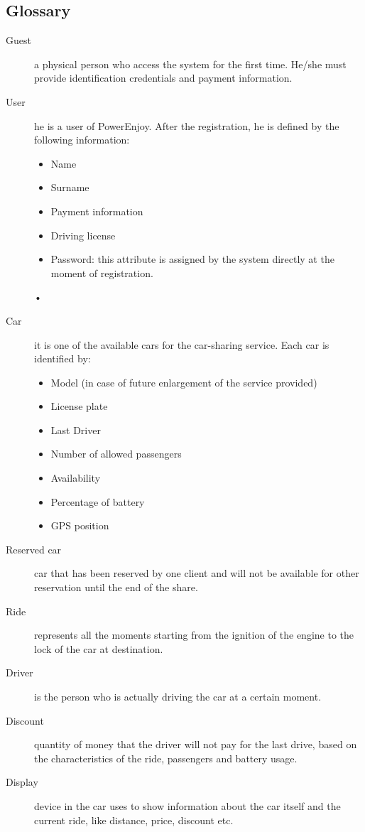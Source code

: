 \documentclass[10pt, a4paper,titlepage]{article}
\begin{document}
\subsection{Glossary}
\begin{description}
\item [Guest] a physical person who access the system for the first time. He/she must provide identification credentials and payment information.
\item [User] he is a user of PowerEnjoy. After the registration, he is defined by the following information:
\begin{itemize}
\item Name
\item Surname
\item Payment information
\item Driving license
\item Password: this attribute is assigned by the system directly at the moment of registration.
\end{itemize}•
\item [Car] it is one of the available cars for the car-sharing service. Each car is identified by:
\begin{itemize}
\item Model (in case of future enlargement of the service provided)
\item License plate
\item Last Driver
\item Number of allowed passengers
\item Availability
\item Percentage of battery
\item GPS position
\end{itemize}
\item [Reserved car] car that has been reserved by one client and will not be available for other reservation until the end of the share.
\item [Ride] represents all the moments starting from the ignition of the engine to the lock of the car at destination.
\item [Driver] is the person who is actually driving the car at a certain moment.
\item [Discount] quantity of money that the driver will not pay for the last drive, based on the characteristics of the ride, passengers and battery usage.
\item [Display] device in the car uses to show information about the car itself and the current ride, like distance, price, discount etc.

\end{description}
\end{document}
